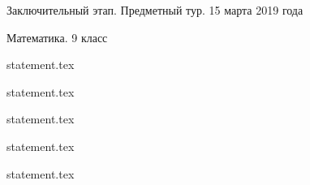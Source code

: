 \documentclass[a4paper,11pt, oneside]{book}
\begin{document}
\vspace{-3mm}
\vspace{-5mm}

\normalsize

\begin{center}
    Заключительный этап. Предметный тур. 15 марта 2019 года
    
    Математика. 9 класс
\end{center}

\parindent=0cm

{statement.tex}

{statement.tex}

{statement.tex}

\clearpage

{statement.tex}

{statement.tex}
\end{document}
